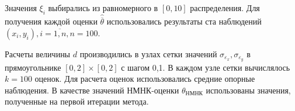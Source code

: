 Значения \( \xi_i \) выбирались из равномерного в \( [0, 10] \) распределения.
Для получения каждой оценки \( \hat{\overline{\theta}} \) использовались результаты
ста наблюдений \( ( x_i, y_i ), i = \overline{1, n}, n = 100 \).

Расчеты величины \( d \) производились в узлах сетки значений
\( \sigma_{\varepsilon_x}, \sigma_{\varepsilon_y} \) в прямоугольнике
\( [0, 2] \times [0, 2] \) с шагом 0{,}1.
В каждом узле сетки вычислялось \( k = 100 \) оценок.
Для расчета оценок использовались средние опорные наблюдения.
В качестве значений НМНК-оценки \( \theta_{\text{НМНК}} \)
использованы значения, полученные на первой итерации метода.







